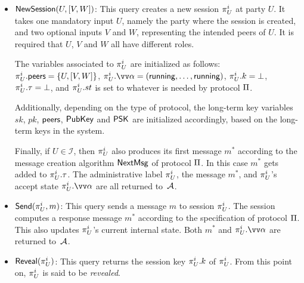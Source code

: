 \begin{itemize}	

	\item $\mathsf{NewSession}(U, [V, W])$:
	This query creates a new session $\oracle[U][i]$ at party $U$.
	It takes one mandatory input $U$,
	namely the party where the session is created,
	and two optional inputs $V$ and $W$,
	representing the intended peers of $U$.
	It is required that $U$, $V$ and $W$  all have different roles.
		 
	The variables associated to $\oracle[U][i]$ are initialized as follows:
	 $\oracle[U][i].\peers = \lbrace U, [V, W] \rbrace$, 
	 $\oracle[U][i].\vrunstate = (\running, \dotsc, \allowbreak \running )$, 
	 $\oracle[U][i].\key = \bot$,
	 $\oracle[U][i].\localtranscript = \bot$,
	 and $\oracle[U][i].\st$ is set to whatever is needed by protocol $\mathrm{\Pi}$.
	 
	Additionally,
	depending on the type of protocol, 
	the long-term key variables $sk$, $pk$, $\mathsf{peers}$, $\mathsf{PubKey}$ and $\mathsf{PSK}$ are initialized accordingly,
	based on the long-term keys in the system.
	  
	Finally,
	if $U \in \mathcal{I}$,
	then $\oracle[U][i]$ also produces its first message $m^*$ according to the message creation algorithm $\mathsf{NextMsg}$ of protocol $\mathrm{\Pi}$.
	In this case $m^*$ gets added to $\oracle[U][i].\localtranscript$.
	The administrative label $\oracle[U][i]$,
	the message $m^*$,
	and $\oracle[U][i]$'s accept state $\oracle[U][i].\vrunstate$ are all returned to~$\mathcal{A}$.
	 

	\item $\Send(\oracle[U][i], m)$:
	This query sends a message $m$ to session $\oracle[U][i]$.
	The session computes a response message $m^*$ according to the specification of protocol $\mathrm{\Pi}$.
	This also updates  $\oracle[U][i]$'s current internal state.
	Both $m^*$ and $\oracle[U][i].\vrunstate$ are returned to~$\mathcal{A}$.


	\item $\Reveal(\oracle[U][i])$: 
	This query returns the session key $\oracle[U][i].\key$ of $\oracle[U][i]$.
	From this point on,
	$\oracle[U][i]$ is said to be \emph{revealed}.
	

\end{itemize}
